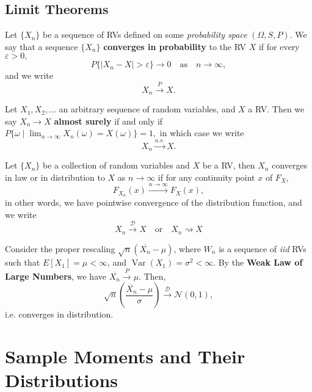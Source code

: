 \documentclass{tufte-handout}
\DeclareMathOperator{\var}{Var}
\begin{document}
\subsection{Limit Theorems}%
  \label{sub:Limit Theorems}
  
\begin{definition}
  Let $\{X_n\}$ be a sequence of RVs defined on some \textit{probability space} $(\Omega, S, P)$. We say that a sequence $\{X_n\}$ \textbf{converges in probability} to the RV $X$ if for every $\varepsilon > 0,$ 
  $$P\{|X_n- X|> \varepsilon\}\to 0 \quad \text{as} \quad n\to \infty ,  $$
  and we write 
  $$X_n \overset{P}{\to} X. $$

\end{definition}
\begin{definition}
  Let $X_1,X_2,...$ an arbitrary sequence of random variables, and $X$ a RV. Then we say $X_n \to X$ \textbf{almost surely} if and only if $P\{ \omega \mid \lim_{n \to \infty} X_n(\omega) = X(\omega)\} = 1, $ in which case we write $$X_n \overset{a.s.}{\to}X.$$ 
\end{definition}
\begin{definition}
  Let $\{X_n\}$ be a collection of random variables and $X$ be a RV, then $X_n$ converges in law or in distribution to $X$ as $n \to \infty$ if for any continuity point $x$ of $F_X$,$$F_{X_n}(x)\overset{n\to \infty}{\longrightarrow} F_X(x), $$
  in other words, we have pointwise convergence of the distribution function, and we write 
  $$X_n\overset{\mathcal{D}}{\to}X \quad \text{or}\quad X_n \rightsquigarrow X $$
  
\end{definition}
\begin{theorem}
  Consider the proper rescaling $\sqrt{n} (\overline{X_n}-\mu)$, where $W_n$ is a sequence of \textit{iid} RVs such that $E[X_1] = \mu < \infty$, and $\var(X_1)= \sigma^2 < \infty. $ By the \textbf{Weak Law of Large Numbers}, we have $ \overline{X_n} \overset{P}{\to} \mu.$ Then, 
  $$\sqrt{n} \left( \frac{\overline{X_n}-\mu}{\sigma} \right)\overset{\mathcal{D}}{\to} \mathcal{N}(0,1), $$
  i.e. converges in distribution. 
\end{theorem}

\section{Sample Moments and Their Distributions}
\end{document}

